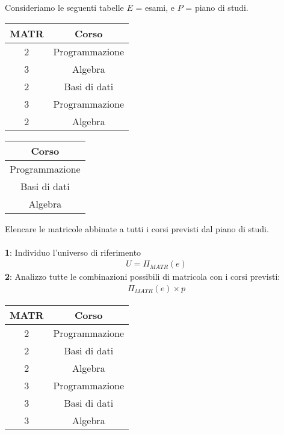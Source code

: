 Consideriamo le seguenti tabelle $E$ = esami, e $P$ = piano di studi.
    \begin{center}\begin{tabular}{|c|c|}\hline
        \textbf{MATR} & \textbf{Corso} \\ \hline
        2 & Programmazione \\ \hline
        3 & Algebra \\ \hline
        2 & Basi di dati \\ \hline
        3 & Programmazione \\ \hline
        2 & Algebra \\ \hline
    \end{tabular} \quad \begin{tabular}{|c|}\hline
        \textbf{Corso}\\ \hline
        Programmazione\\ \hline
        Basi di dati\\ \hline
        Algebra\\ \hline
    \end{tabular}\end{center}
Elencare le matricole abbinate a tutti i corsi previsti dal piano di studi.\\\\
\textbf{1}: Individuo l'universo di riferimento
    \begin{equation}\begin{aligned}
        U = \Pi_{MATR} (e)
    \end{aligned}\end{equation}
\textbf{2}: Analizzo tutte le combinazioni possibili di matricola con i corsi previsti:
    \begin{equation}\begin{aligned}
        \Pi_{MATR}(e) \times p
    \end{aligned}\end{equation}
    \begin{center}\begin{tabular}{|c|c|}\hline
        \textbf{MATR} & \textbf{Corso} \\ \hline
        2 & Programmazione \\ \hline
        2 & Basi di dati \\ \hline
        2 & Algebra \\ \hline
        3 & Programmazione \\ \hline
        3 & Basi di dati \\ \hline
        3 & Algebra \\ \hline
    \end{tabular}\end{center}

